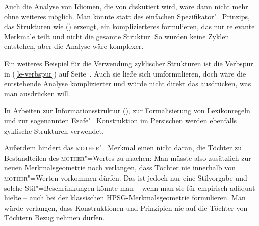 Auch die Analyse von Idiomen, die von \citet{SS2003a}
diskutiert wird, wäre dann nicht mehr ohne weiteres möglich. Man könnte statt des einfachen
Spezifikator"=Prinzips, das Strukturen wie () erzeugt, ein komplizierteres formulieren, das
nur relevante Merkmale teilt und nicht die gesamte Struktur. So würden keine Zyklen entstehen, aber
die Analyse wäre komplexer. 

Ein weiteres Beispiel für die Verwendung zyklischer Strukturen ist die Verbspur in
(\ref{le-verbspur}) auf Seite~\pageref{le-verbspur}. Auch sie ließe sich umformulieren, doch wäre
die entstehende Analyse komplizierter und würde nicht direkt das ausdrücken, was man ausdrücken will.%

In Arbeiten zur Informationsstruktur (\citealp[]{EV94a}), zur
Formalisierung von Lexikonregeln \citep[]{Meurers2001a} und zur
sogenannten Ezafe"=Konstruktion im Persischen \citep[]{Samvelian2007a} werden
ebenfalls zyklische Strukturen verwendet.



Außerdem hindert das \textsc{mother}"=Merkmal einen nicht daran, die Töchter zu Bestandteilen des \textsc{mother}"=Wertes zu machen:
\ea
\label{sb-cxg-daughters-in-mother}
\z
Man müsste also zusätzlich zur neuen Merkmalsgeometrie noch verlangen, dass Töchter nie innerhalb
von \textsc{mother}"=Werten vorkommen dürfen. Das ist jedoch nur eine Stilvorgabe und solche
Stil"=Beschränkungen könnte man -- wenn man sie für empirisch adäquat hielte -- auch bei der
klassischen HPSG-Merkmalsgeometrie formulieren. Man würde verlangen, dass Konstruktionen und Prinzipien nie auf die
Töchter von Töchtern Bezug nehmen dürfen.

